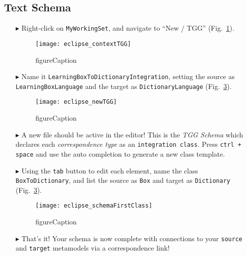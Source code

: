 \newpage
\hypertarget{schema tex}{}
\subsection{Text Schema}
\texHeader


\begin{itemize}

\item[$\blacktriangleright$] Right-click on \texttt{MyWorkingSet}, and navigate to ``New / TGG'' (Fig.~\ref{fig:contextTGG}).

\begin{figure}[htbp]
\begin{center}
  \texttt{[image: eclipse\_contextTGG]}
  \caption{figureCaption}
  \label{fig:contextTGG}
\end{center}
\end{figure}

\item[$\blacktriangleright$] Name it \texttt{LearningBoxToDictionaryIntegration}, setting the source as \texttt{LearningBoxLanguage} and the target as
\texttt{DictionaryLanguage} (Fig.~\ref{fig:newTGG}).

\begin{figure}[htbp]
\begin{center}
  \texttt{[image: eclipse\_newTGG]}
  \caption{figureCaption}
  \label{fig:newTGG}
\end{center}
\end{figure}

\item[$\blacktriangleright$] A new file should be active in the editor! This is the \emph{TGG Schema} which declares each \emph{correspondence type} as an
\texttt{integration class}. Press \texttt{ctrl + space} and use the auto completion to generate a new class template.

\item[$\blacktriangleright$] Using the \texttt{tab} button to edit each element, name the class \texttt{BoxToDictionary}, and list the source as \texttt{Box}
and target as \texttt{Dictionary} (Fig.~\ref{fig:newTGG}).

\begin{figure}[htbp]
\begin{center}
  \texttt{[image: eclipse\_schemaFirstClass]}
  \caption{figureCaption}
  \label{fig:newTGG}
\end{center}
\end{figure}

\item[$\blacktriangleright$] That's it! Your schema is now complete with connections to your \texttt{source} and \texttt{target} metamodels via a correspondence
link!

\end{itemize}
